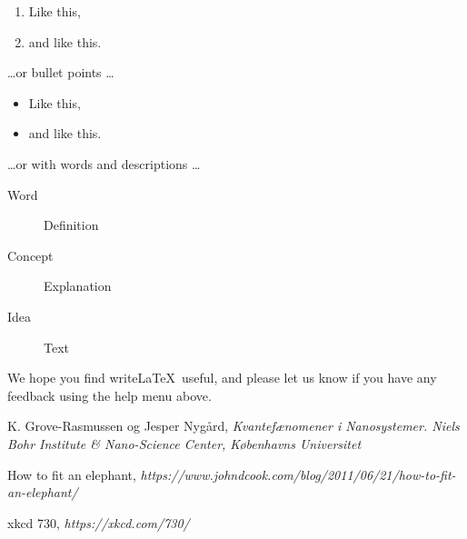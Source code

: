 \documentclass[a4paper]{article}
\begin{document}
\begin{enumerate}
\item Like this,
\item and like this.
\end{enumerate}
\dots or bullet points \dots
\begin{itemize}
\item Like this,
\item and like this.
\end{itemize}
\dots or with words and descriptions \dots
\begin{description}
\item[Word] Definition
\item[Concept] Explanation
\item[Idea] Text
\end{description}

We hope you find write\LaTeX\ useful, and please let us know if you have any feedback using the help menu above.

\begin{thebibliography}{9}
  K. Grove-Rasmussen og Jesper Nygård,
  \emph{Kvantefænomener i Nanosystemer.
  Niels Bohr Institute \& Nano-Science Center, Københavns Universitet}

  How to fit an elephant,
  \emph{https://www.johndcook.com/blog/2011/06/21/how-to-fit-an-elephant/}
  
  xkcd 730,
  \emph{https://xkcd.com/730/}

\end{thebibliography}
\end{document}
